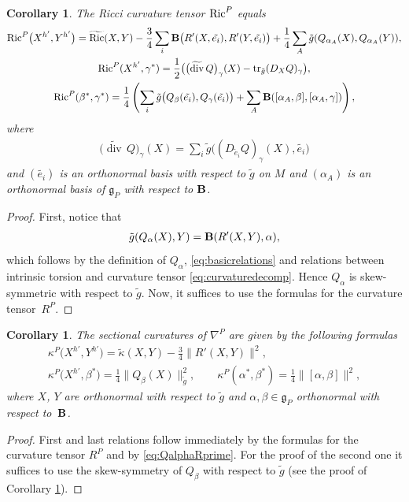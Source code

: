 \documentclass[pdftex]{sigma}
\numberwithin{equation}{section}
\newtheorem{Corollary}[Theorem]{Corollary}
\begin{document}
\begin{Corollary}\label{cor:RicciP}
The Ricci curvature tensor ${\rm Ric}^P$ equals
\begin{gather*}
{\rm Ric}^P\big(X^{h'},Y^{h'}\big) =\widetilde{{\rm Ric}}(X,Y)-\frac{3}{4}\sum_i{\bf B}\big(R'(X,\tilde{e_i}),R'(Y,\tilde{e_i})\big)
+\frac{1}{4}\sum_A \tilde{g}(Q_{\alpha_A}(X),Q_{\alpha_A}(Y)),\\
{\rm Ric}^P(X^{h'},\gamma^{\ast}) =\frac{1}{2}\big( \big(\widetilde{\operatorname{div}}\, Q\big)_{\gamma}(X)-\operatorname{tr}_{\tilde{g}}(D_XQ)_{\gamma} \big),\\
{\rm Ric}^P(\beta^{\ast},\gamma^{\ast}) =\frac{1}{4}\left( \sum_i \tilde{g}\big(Q_{\beta}(\tilde{e_i}),Q_{\gamma}(\tilde{e_i})\big)+\sum_A {\bf B}([\alpha_A,\beta],[\alpha_A,\gamma]) \right),
\end{gather*}
where
\begin{gather*}
\big(\widetilde{\operatorname{div}}\,  Q\big)_{\gamma}(X)=\sum_i\tilde{g}\big((D_{\tilde e_i}Q)_{\gamma}(X),\tilde{e_i}\big)
\end{gather*}
and $(\tilde{e_i})$ is an orthonormal basis with respect to $\tilde{g}$ on $M$ and $(\alpha_A)$ is an orthonormal basis of $\mathfrak{g}_P$ with respect to ${\bf B}$.
\end{Corollary}
\begin{proof}
First, notice that
\begin{gather}\label{eq:QalphaRprime}
\tilde{g}(Q_{\alpha}(X),Y)={\bf B}(R'(X,Y),\alpha),
\end{gather}
which follows by the def\/inition of $Q_{\alpha}$, \eqref{eq:basicrelations} and relations between intrinsic torsion and curvature tensor \eqref{eq:curvaturedecomp}. Hence $Q_{\alpha}$ is skew-symmetric with respect to $\tilde{g}$. Now, it suf\/f\/ices to use the formulas for the curvature tensor~$R^P$.
\end{proof}

\begin{Corollary}\label{cor:SectionalP}
The sectional curvatures of $\nabla^P$ are given by the following formulas
\begin{gather*}
\kappa^P\big(X^{h'},Y^{h'}\big) =\tilde{\kappa}(X,Y)-\frac{3}{4}\|R'(X,Y)\|^2,\\
\kappa^P\big(X^{h'},\beta^{\ast}\big) =\frac{1}{4}\|Q_{\beta}(X)\|^2_{\tilde{g}},\qquad
\kappa^P(\alpha^{\ast},\beta^{\ast}) =\frac{1}{4}\|[\alpha,\beta]\|^2,
\end{gather*}
where $X$, $Y$ are orthonormal with respect to $\tilde{g}$ and $\alpha,\beta\in\mathfrak{g}_P$ orthonormal with respect to~${\bf B}$.
\end{Corollary}
\begin{proof}
First and last relations follow immediately by the formulas for the curvature tensor $R^P$ and by \eqref{eq:QalphaRprime}. For the proof of the second one it suf\/f\/ices to use the skew-symmetry of $Q_{\beta}$ with respect to $\tilde{g}$ (see the proof of Corollary \ref{cor:RicciP}).
\end{proof}
\end{document}
